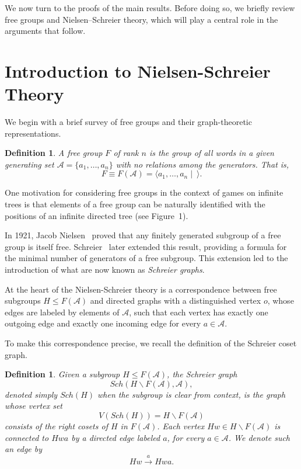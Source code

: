 \documentclass[a4,12pt]{article}%
\newtheorem{definition}[theorem]{Definition}
\begin{document}
We now turn to the proofs of the main results. Before doing so, we briefly review free groups and Nielsen–Schreier theory, which will play a central role in the arguments that follow.

\section{Introduction to Nielsen-Schreier Theory}
\label{section:Introduction To Nielsen-Schreier Theory}
We begin with a brief survey of free groups and their graph-theoretic representations.

\begin{definition}
A \emph{free group} $F$ of rank $n$ is the group of all words in a given generating set $\mathcal{A} = \{ a_1, \dots, a_n \}$ with no relations among the generators. That is,
\[
F \equiv F(\mathcal{A}) = \langle a_1, \dots, a_n \mid \ \rangle.
\]
\end{definition}

One motivation for considering free groups in the context of games on infinite trees is that elements of a free group can be naturally identified with the positions of an infinite directed tree (see Figure~1). 

In 1921, Jacob Nielsen~\cite{nielsen21} proved that any finitely generated subgroup of a free group is itself free. Schreier~\cite{Schreier27} later extended this result, providing a formula for the minimal number of generators of a free subgroup. This extension led to the introduction of what are now known as \emph{Schreier graphs}. 

At the heart of the Nielsen-Schreier theory is a correspondence between free subgroups $H \leq F(\mathcal{A})$ and directed graphs with a distinguished vertex $o$, whose edges are labeled by elements of $\mathcal{A}$, such that each vertex has exactly one outgoing edge and exactly one incoming edge for every $a \in \mathcal{A}$.

To make this correspondence precise, we recall the definition of the Schreier coset graph.

\begin{definition}
Given a subgroup $H \leq F(\mathcal{A})$, the \emph{Schreier graph} 
\[
Sch(H \backslash F(\mathcal{A}), \mathcal{A}),
\] 
denoted simply $Sch(H)$ when the subgroup is clear from context, is the graph whose vertex set
\[
V(Sch(H)) = H \backslash F(\mathcal{A})
\] 
consists of the right cosets of $H$ in $F(\mathcal{A})$. Each vertex $Hw \in H \backslash F(\mathcal{A})$ is connected to $Hwa$ by a directed edge labeled $a$, for every $a \in \mathcal{A}$. We denote such an edge by
\[
Hw \xrightarrow{a} Hwa.
\]
\end{definition}
\end{document}
